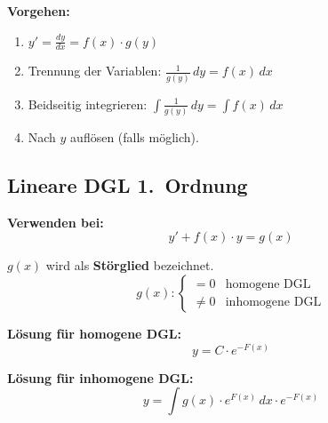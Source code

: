 \textbf{Vorgehen:}
\begin{enumerate}
    \item $\displaystyle y' = \frac{dy}{dx} = f(x) \cdot g(y)$
    \item Trennung der Variablen: $\displaystyle \frac{1}{g(y)} \, dy = f(x)\,dx$
    \item Beidseitig integrieren: $\displaystyle \int \frac{1}{g(y)} \, dy = \int f(x)\,dx$
    \item Nach $y$ auflösen (falls möglich).
\end{enumerate}

\subsection{Lineare DGL 1.\ Ordnung}
\textbf{Verwenden bei:} 
\[y' + f(x) \cdot y = g(x)\]

\(g(x)\) wird als \textbf{Störglied} bezeichnet. 
\[
    g(x): \begin{cases}
        = 0 & \text{homogene DGL} \\
        \neq 0 & \text{inhomogene DGL}
    \end{cases}
\]

\textbf{Lösung für homogene DGL:}
\[
    y = C \cdot e^{-F(x)}
\]

\textbf{Lösung für inhomogene DGL:}
\[
    y = \int g(x) \cdot e^{F(x)}\,dx \cdot e^{-F(x)}
\]
